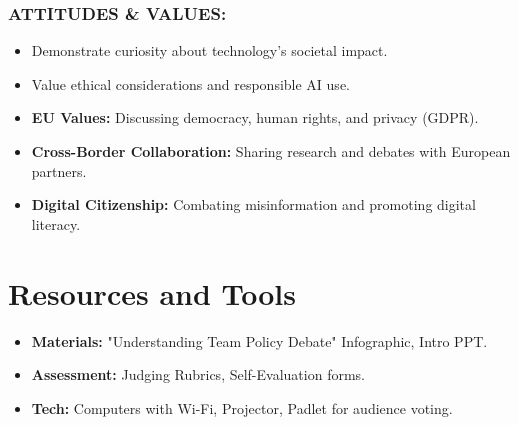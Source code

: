 \documentclass[11pt, a4paper]{article}
\begin{document}
\subsubsection*{ATTITUDES \& VALUES:}
\begin{itemize}
    \item Demonstrate curiosity about technology's societal impact.
    \item Value ethical considerations and responsible AI use.
\end{itemize}

\begin{eurobox}
\begin{itemize}
    \item \textbf{EU Values:} Discussing democracy, human rights, and privacy (GDPR).
    \item \textbf{Cross-Border Collaboration:} Sharing research and debates with European partners.
    \item \textbf{Digital Citizenship:} Combating misinformation and promoting digital literacy.
\end{itemize}
\end{eurobox}

\newpage
\section{Resources and Tools}
\begin{itemize}
    \item \textbf{Materials:} "Understanding Team Policy Debate" Infographic, Intro PPT.
    \item \textbf{Assessment:} Judging Rubrics, Self-Evaluation forms.
    \item \textbf{Tech:} Computers with Wi-Fi, Projector, Padlet for audience voting.
\end{itemize}
\end{document}
